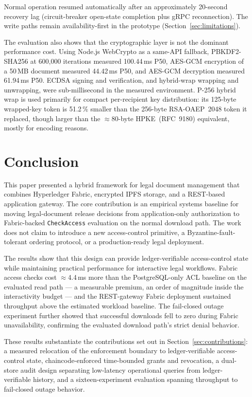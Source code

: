 \documentclass[preprint,12pt]{elsarticle}
\begin{document}
Normal operation resumed automatically after an approximately 20-second
recovery lag (circuit-breaker open-state completion plus gRPC
reconnection). The write paths remain availability-first in the
prototype (Section~\ref{sec:limitations}).

The evaluation also shows that the cryptographic layer is not the dominant
performance cost. Using Node.js WebCrypto as a same-API fallback,
PBKDF2-SHA256 at 600,000 iterations measured 100.44\,ms P50, AES-GCM
encryption of a 50\,MB document measured 44.42\,ms P50, and AES-GCM
decryption measured 61.94\,ms P50. ECDSA signing and verification, and hybrid-wrap
wrapping and unwrapping, were sub-millisecond in the measured environment.
P-256 hybrid wrap is used primarily for compact per-recipient key
distribution: its 125-byte wrapped-key token is 51.2\,\% smaller than the
256-byte RSA-OAEP~2048 token it replaced, though larger than the
$\approx$80-byte HPKE~(RFC~9180) equivalent, mostly for encoding reasons.

\FloatBarrier
\section{Conclusion}
\label{sec:conclusion}

This paper presented a hybrid framework for legal document management that
combines Hyperledger Fabric, encrypted IPFS storage, and a REST-based
application gateway. The core contribution is an empirical systems baseline
for moving legal-document release decisions from application-only
authorization to Fabric-backed \texttt{CheckAccess} evaluation on the normal
download path. The work does not claim to introduce a new access-control
primitive, a Byzantine-fault-tolerant ordering protocol, or a production-ready
legal deployment.

The results show that this design can provide ledger-verifiable
access-control state while maintaining practical performance for interactive
legal workflows. Fabric access checks cost $\approx$4.4\,ms more than the
PostgreSQL-only ACL baseline on the evaluated read path --- a measurable
premium, an order of magnitude inside the interactivity budget --- and the
REST-gateway Fabric deployment sustained throughput above the estimated
workload baseline. The fail-closed outage experiment further showed that
successful downloads fell to zero during Fabric unavailability, confirming
the evaluated download path's strict denial behavior.

These results substantiate the contributions set out in
Section~\ref{sec:contributions}: a measured relocation of the enforcement
boundary to ledger-verifiable access-control state, chaincode-enforced
time-bounded grants and revocation, a dual-store audit design separating
low-latency operational queries from ledger-verifiable history, and a
sixteen-experiment evaluation spanning throughput to fail-closed outage
behavior.
\end{document}
